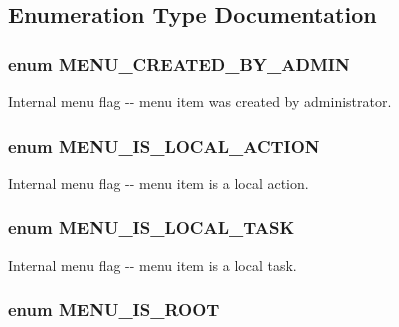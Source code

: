 \subsection{Enumeration Type Documentation}
\hypertarget{group__menu__flags_ga4e3c1ba9817162fc27cb19aeaa7d9373}{
\subsubsection[{MENU\_\-CREATED\_\-BY\_\-ADMIN}]{\setlength{\rightskip}{0pt plus 5cm}enum {\bf MENU\_\-CREATED\_\-BY\_\-ADMIN}}}
\label{group__menu__flags_ga4e3c1ba9817162fc27cb19aeaa7d9373}
Internal menu flag -\/-\/ menu item was created by administrator. \hypertarget{group__menu__flags_ga91f0814c85a485d700a1955a00e2c0b8}{
\subsubsection[{MENU\_\-IS\_\-LOCAL\_\-ACTION}]{\setlength{\rightskip}{0pt plus 5cm}enum {\bf MENU\_\-IS\_\-LOCAL\_\-ACTION}}}
\label{group__menu__flags_ga91f0814c85a485d700a1955a00e2c0b8}
Internal menu flag -\/-\/ menu item is a local action. \hypertarget{group__menu__flags_ga1dabe85b3ecd23eec02b20ef2d2f6259}{
\subsubsection[{MENU\_\-IS\_\-LOCAL\_\-TASK}]{\setlength{\rightskip}{0pt plus 5cm}enum {\bf MENU\_\-IS\_\-LOCAL\_\-TASK}}}
\label{group__menu__flags_ga1dabe85b3ecd23eec02b20ef2d2f6259}
Internal menu flag -\/-\/ menu item is a local task. \hypertarget{group__menu__flags_ga24354914e560f062f1999c2caddcb557}{
\subsubsection[{MENU\_\-IS\_\-ROOT}]{\setlength{\rightskip}{0pt plus 5cm}enum {\bf MENU\_\-IS\_\-ROOT}}}
